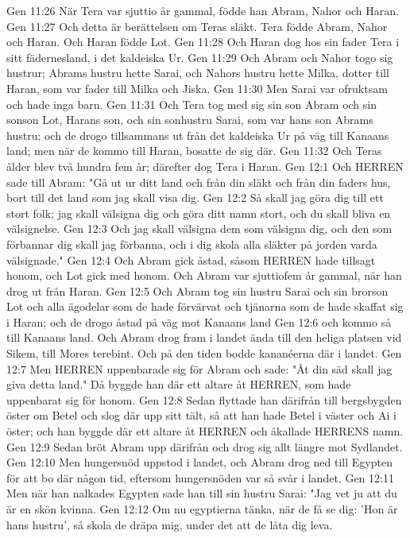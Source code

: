 Gen 11:26  När Tera var sjuttio år gammal, födde han Abram, Nahor och Haran.
Gen 11:27  Och detta är berättelsen om Teras släkt. Tera födde Abram, Nahor och Haran. Och Haran födde Lot.
Gen 11:28  Och Haran dog hos sin fader Tera i sitt fädernesland, i det kaldeiska Ur.
Gen 11:29  Och Abram och Nahor togo sig hustrur; Abrams hustru hette Sarai, och Nahors hustru hette Milka, dotter till Haran, som var fader till Milka och Jiska.
Gen 11:30  Men Sarai var ofruktsam och hade inga barn.
Gen 11:31  Och Tera tog med sig sin son Abram och sin sonson Lot, Harans son, och sin sonhustru Sarai, som var hans son Abrams hustru; och de drogo tillsammans ut från det kaldeiska Ur på väg till Kanaans land; men när de kommo till Haran, bosatte de sig där.
Gen 11:32  Och Teras ålder blev två hundra fem år; därefter dog Tera i Haran.
Gen 12:1  Och HERREN sade till Abram: "Gå ut ur ditt land och från din släkt och från din faders hus, bort till det land som jag skall visa dig.
Gen 12:2  Så skall jag göra dig till ett stort folk; jag skall välsigna dig och göra ditt namn stort, och du skall bliva en välsignelse.
Gen 12:3  Och jag skall välsigna dem som välsigna dig, och den som förbannar dig skall jag förbanna, och i dig skola alla släkter på jorden varda välsignade."
Gen 12:4  Och Abram gick åstad, såsom HERREN hade tillsagt honom, och Lot gick med honom. Och Abram var sjuttiofem år gammal, när han drog ut från Haran.
Gen 12:5  Och Abram tog sin hustru Sarai och sin brorson Lot och alla ägodelar som de hade förvärvat och tjänarna som de hade skaffat sig i Haran; och de drogo åstad på väg mot Kanaans land
Gen 12:6  och kommo så till Kanaans land. Och Abram drog fram i landet ända till den heliga platsen vid Sikem, till Mores terebint. Och på den tiden bodde kananéerna där i landet.
Gen 12:7  Men HERREN uppenbarade sig för Abram och sade: "Åt din säd skall jag giva detta land." Då byggde han där ett altare åt HERREN, som hade uppenbarat sig för honom.
Gen 12:8  Sedan flyttade han därifrån till bergsbygden öster om Betel och slog där upp sitt tält, så att han hade Betel i väster och Ai i öster; och han byggde där ett altare åt HERREN och åkallade HERRENS namn.
Gen 12:9  Sedan bröt Abram upp därifrån och drog sig allt längre mot Sydlandet.
Gen 12:10  Men hungersnöd uppstod i landet, och Abram drog ned till Egypten för att bo där någon tid, eftersom hungersnöden var så svår i landet.
Gen 12:11  Men när han nalkades Egypten sade han till sin hustru Sarai: "Jag vet ju att du är en skön kvinna.
Gen 12:12  Om nu egyptierna tänka, när de få se dig: 'Hon är hans hustru', så skola de dräpa mig, under det att de låta dig leva.
